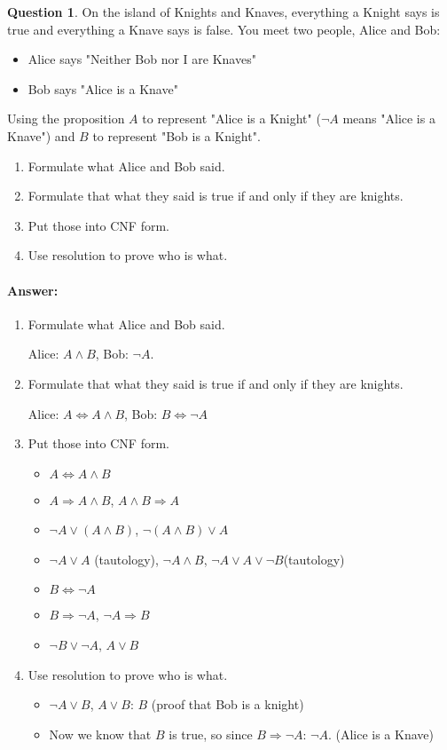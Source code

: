 \documentclass[11pt,a4paper]{article}
\theoremstyle{definition}%
\newtheorem{Q}{Question}[] %
\newcommand{\reponse}[1]{%
\ifthenelse {\boolean{corrige}} {\paragraph{Answer:} \color{darkblue}   #1\color{black}} {}
}
\begin{document}
\begin{Q}
    On the island of Knights and Knaves, everything a Knight says is true and everything a Knave says
    is false. You meet two people, Alice and Bob:
    \begin{itemize}
        \item Alice says "Neither Bob nor I are Knaves"
        \item Bob says "Alice is a Knave"
    \end{itemize}
    Using the proposition $A$ to represent "Alice is a Knight" ($\neg A$ means "Alice is a Knave")
    and $B$ to represent "Bob is a Knight".
    \begin{enumerate}
        \item Formulate what Alice and Bob said.
        \item Formulate that what they said is true if and only if they are knights.
        \item Put those into CNF form.
        \item Use resolution to prove who is what.
    \end{enumerate}
    \reponse{
    \begin{enumerate}
        \item Formulate what Alice and Bob said.

            Alice: $A \wedge B$, Bob: $\neg A$.
        \item Formulate that what they said is true if and only if they are knights.

            Alice: $A \Leftrightarrow A \wedge B$, Bob: $B \Leftrightarrow \neg A$
        \item Put those into CNF form.
            \begin{itemize}
                \item $A \Leftrightarrow A \wedge B$
                \item $A \Rightarrow A \wedge B$, $A \wedge B \Rightarrow A$
                \item $\neg A \vee (A \wedge B)$, $\neg(A \wedge B) \vee A$
                \item $\neg A \vee A$ (tautology), $\neg A \wedge B$, $\neg A \vee A \vee \neg B$(tautology)
                \item $ B \Leftrightarrow \neg A$
                \item $B \Rightarrow \neg A$, $\neg A \Rightarrow B$
                \item $\neg B \vee \neg A$, $A \vee B$

            \end{itemize}
        \item Use resolution to prove who is what.
            \begin{itemize}
                \item $\neg A \vee B$, $A \vee B$: $B$ (proof that Bob is a knight)
                \item Now we know that $B$ is true, so since $B \Rightarrow \neg A$: $\neg A$. (Alice
                    is a Knave)

            \end{itemize}
    \end{enumerate}
    }
\end{Q}
\end{document}
